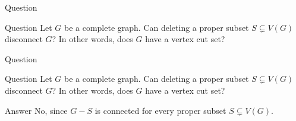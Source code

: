 \documentclass[aspectratio=169,11pt]{beamer}
\begin{document}
	\begin{frame}[t]{Question}
		\vspace{0.3cm}
		\begin{block}{Question}
			Let $G$ be a complete graph. Can deleting a proper subset
			$S\subsetneq V(G)$ disconnect $G$? In other words, does $G$ have a vertex cut set?
		\end{block}
	\end{frame}
	
	\begin{frame}[t]{Question}
		\vspace{0.3cm}
		\begin{block}{Question}
			Let $G$ be a complete graph. Can deleting a proper subset
			$S\subsetneq V(G)$ disconnect $G$? In other words, does $G$ have a vertex cut set?
		\end{block}
		\vspace{0.8cm}
		\begin{block}{Answer}
			No, since $G-S$ is connected for every proper subset $S\subsetneq V(G)$.
		\end{block}
	\end{frame}
	
\end{document}
